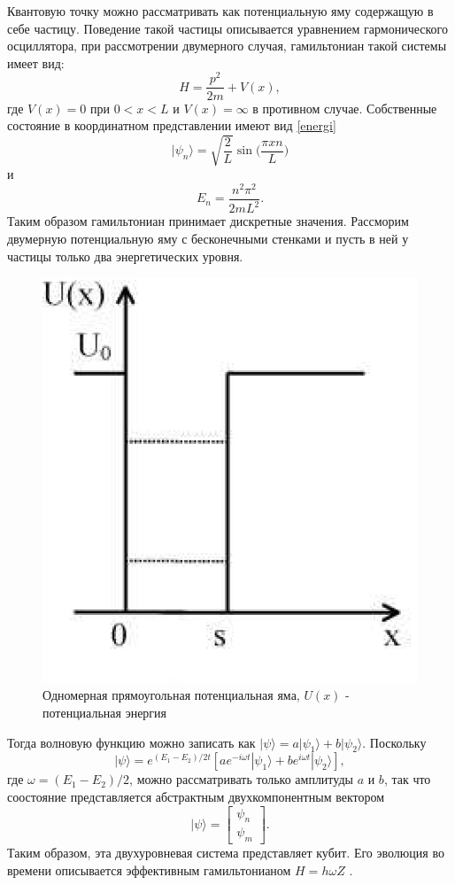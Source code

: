 \documentclass[14pt,a4paper]{PhDthesis}
\begin{document}
Квантовую точку можно рассматривать как потенциальную яму содержащую в себе частицу. Поведение такой частицы описывается уравнением гармонического осциллятора, при рассмотрении двумерного случая, гамильтониан такой системы имеет вид: 
\begin{equation}
H = \dfrac{p^{2}}{2m} + V(x),
\end{equation}
где $V(x) = 0$ при $0 < x < L$ и $V(x) = \infty$ в противном случае. Собственные состояние в координатном представлении имеют вид \ref{energi}
\begin{equation}
|\psi_{n}\rangle = \sqrt{\frac{2}{L}}\sin \Bigr(\frac{\pi x n}{L} \Bigr)
\end{equation}
и	
\begin{equation}
E_{n} = \frac{n^{2} \pi^{2}}{2 m L^{2}} \label{energi}.
\end{equation}
Таким образом гамильтониан принимает дискретные значения.
Рассморим двумерную потенциальную яму с бесконечными стенками и пусть в ней у частицы только два энергетических уровня. 
\begin{figure}[h!]
\centering\includegraphics[width=.50\textwidth]{images/potents.eps}
\caption{Одномерная прямоугольная потенциальная яма, $U(x)$ - потенциальная энергия}\label{ris:potents}
\end{figure}
Тогда волновую функцию можно записать как $|\psi\rangle = a|\psi_{1}\rangle + b|\psi_{2}\rangle$. Поскольку
\begin{equation}
|\psi\rangle = e^{(E_{1} - E_{2})/2t} [a e^{-i \omega t}|\psi_{1}\rangle + b e^{i \omega t} |\psi_{2}\rangle],
\end{equation}
где $\omega = (E_{1} - E_{2})/2$, можно рассматривать только амплитуды $a$ и $b$, так что соостояние представляется абстрактным двухкомпонентным вектором
\begin{equation}
|\psi\rangle = \begin{bmatrix} \psi_{n} \\ \psi_{m} \end{bmatrix}.
\end{equation}
Таким образом, эта двухуровневая система представляет кубит. Его эволюция во времени описывается эффективным гамильтонианом $H = h \omega Z$ \cite{Vontsovskiy:1983ru, JaySau:2010}.
\end{document}
